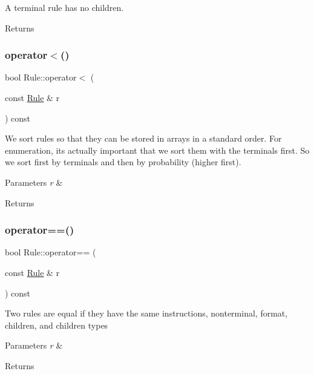 A terminal rule has no children. \begin{DoxyReturn}{Returns}

\end{DoxyReturn}
\mbox{\label{class_rule_a706819fbede2c5a1b0b59f1d28cae30b}} 
\subsubsection{\texorpdfstring{operator$<$()}{operator<()}}
{\footnotesize\ttfamily bool Rule\+::operator$<$ (\begin{DoxyParamCaption}\item[{const \hyperlink{class_rule}{Rule} \&}]{r }\end{DoxyParamCaption}) const\hspace{0.3cm}{\ttfamily [inline]}}

We sort rules so that they can be stored in arrays in a standard order. For enumeration, it\textquotesingle{}s actually important that we sort them with the terminals first. So we sort first by terminals and then by probability (higher first). 
\begin{DoxyParams}{Parameters}
{\em r} & \\
\hline
\end{DoxyParams}
\begin{DoxyReturn}{Returns}

\end{DoxyReturn}
\mbox{\label{class_rule_a183fafc8a6b43515436a1de8f63ec98d}} 
\subsubsection{\texorpdfstring{operator==()}{operator==()}}
{\footnotesize\ttfamily bool Rule\+::operator== (\begin{DoxyParamCaption}\item[{const \hyperlink{class_rule}{Rule} \&}]{r }\end{DoxyParamCaption}) const\hspace{0.3cm}{\ttfamily [inline]}}

Two rules are equal if they have the same instructions, nonterminal, format, children, and children types 
\begin{DoxyParams}{Parameters}
{\em r} & \\
\hline
\end{DoxyParams}
\begin{DoxyReturn}{Returns}

\end{DoxyReturn}
\mbox{\label{class_rule_a4a75588d7821c1bcf087ec6ebf82bd0f}} 
